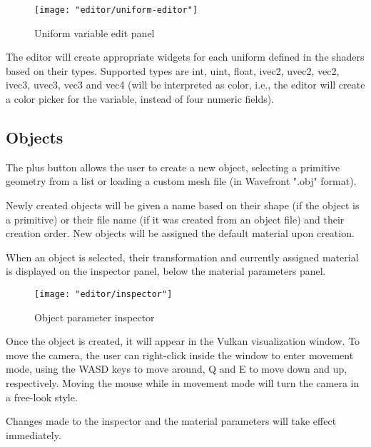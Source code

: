 \begin{figure}
    \centering
    \texttt{[image: "editor/uniform-editor"]}
    \caption{Uniform variable edit panel}
    \label{fig:uniform_editor}
\end{figure}

The editor will create appropriate widgets for each uniform defined in the shaders based on their types. Supported types are int, uint, float, ivec2, uvec2, vec2, ivec3, uvec3, vec3 and vec4 (will be interpreted as color, i.e., the editor will create a color picker for the variable, instead of four numeric fields).

\subsection{Objects}

The plus button allows the user to create a new object, selecting a primitive geometry from a list or loading a custom mesh file (in Wavefront ".obj" format).

Newly created objects will be given a name based on their shape (if the object is a primitive) or their file name (if it was created from an object file) and their creation order. New objects will be assigned the default material upon creation.

When an object is selected, their transformation and currently assigned material is displayed on the inspector panel, below the material parameters panel.

\begin{figure}[h]
    \centering
    \texttt{[image: "editor/inspector"]}
    \caption{Object parameter inspector}
    \label{fig:inspector}
\end{figure}

Once the object is created, it will appear in the Vulkan visualization window. To move the camera, the user can right-click inside the window to enter movement mode, using the WASD keys to move around, Q and E to move down and up, respectively. Moving the mouse while in movement mode will turn the camera in a free-look style.

Changes made to the inspector and the material parameters will take effect immediately.
